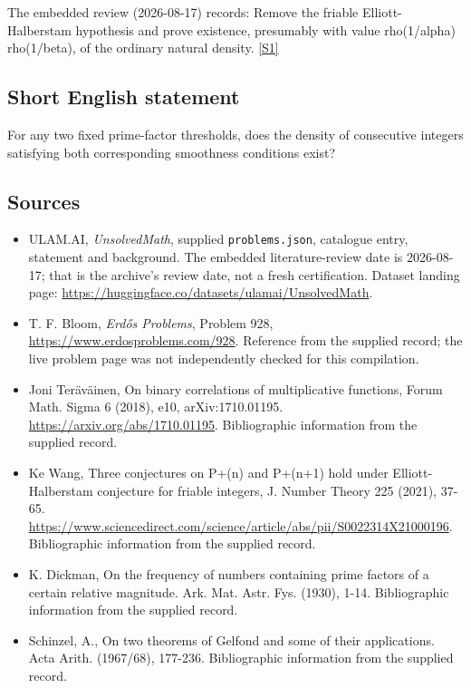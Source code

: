 \documentclass[11pt,a4paper]{article}
\newcommand{\sref}[2]{\hyperlink{source:#1:#2}{[S#2]}}
\begin{document}
The embedded review (2026-08-17) records: Remove the friable Elliott-Halberstam hypothesis and prove existence, presumably with value rho(1/alpha) rho(1/beta), of the ordinary natural density. \sref{statement}{1}

\subsection{Short English statement}

For any two fixed prime-factor thresholds, does the density of consecutive integers satisfying both corresponding smoothness conditions exist?

\subsection{Sources}

{\small

\begin{itemize}

\item[\hypertarget{source:statement:1}{S1}] ULAM.AI, \emph{UnsolvedMath}, supplied \texttt{problems.json}, catalogue entry, statement and background. The embedded literature-review date is 2026-08-17; that is the archive’s review date, not a fresh certification. Dataset landing page: \url{https://huggingface.co/datasets/ulamai/UnsolvedMath}.

\item[\hypertarget{source:statement:2}{S2}] T. F. Bloom, \emph{Erdős Problems}, Problem 928, \url{https://www.erdosproblems.com/928}. Reference from the supplied record; the live problem page was not independently checked for this compilation.

\item[\hypertarget{source:statement:3}{S3}] Joni Teräväinen, On binary correlations of multiplicative functions, Forum Math. Sigma 6 (2018), e10, arXiv:1710.01195. \url{https://arxiv.org/abs/1710.01195}. Bibliographic information from the supplied record.

\item[\hypertarget{source:statement:4}{S4}] Ke Wang, Three conjectures on P+(n) and P+(n+1) hold under Elliott-Halberstam conjecture for friable integers, J. Number Theory 225 (2021), 37-65. \url{https://www.sciencedirect.com/science/article/abs/pii/S0022314X21000196}. Bibliographic information from the supplied record.

\item[\hypertarget{source:statement:5}{S5}] K. Dickman, On the frequency of numbers containing prime factors of a certain relative magnitude. Ark. Mat. Astr. Fys. (1930), 1-14. Bibliographic information from the supplied record.

\item[\hypertarget{source:statement:6}{S6}] Schinzel, A., On two theorems of Gelfond and some of their applications. Acta Arith. (1967/68), 177-236. Bibliographic information from the supplied record.

\end{itemize}

}

\label{end:statement}
\end{document}
